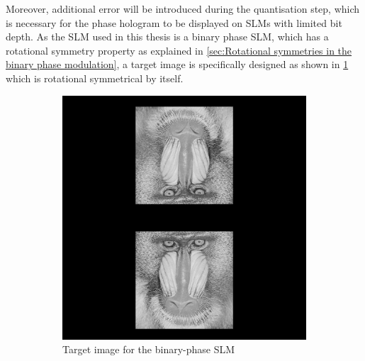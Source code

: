 Moreover, additional error will be introduced during the quantisation step, which is necessary for the phase hologram to be displayed on SLMs with limited bit depth. As the SLM used in this thesis is a binary phase SLM, which has a rotational symmetry property as explained in \cref{sec:Rotational symmetries in the binary phase modulation}, a target image is specifically designed as shown in \cref{fig:mandrill_2} which is rotational symmetrical by itself.

\begin{figure}[H]
  \centering
  \begin{subfigure}[t]{0.3\textwidth}
    \centering
    \includegraphics[width=\textwidth]{mandrill_2.png}
    \caption{Target image for the binary-phase SLM}
    \label{fig:mandrill_2}
  \end{subfigure}
  \hfill
  \begin{subfigure}[t]{0.3\textwidth}
    \centering

\end{subfigure}
\end{figure}
